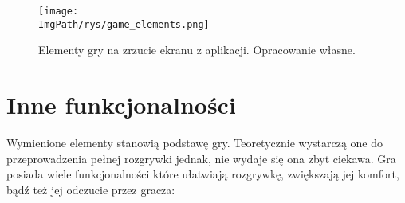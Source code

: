 \documentclass[a4paper,12pt,twoside,openany]{report}
\newcommand{\ImgPath}{.}
\begin{document}
\begin{figure}[!htbp]
	\begin{center}
\centering
\texttt{[image: \\ImgPath/rys/game\_elements.png]}
\end{center}
	\caption{Elementy gry na zrzucie ekranu z aplikacji. Opracowanie własne.}
	\label{game_elements}
\end{figure}

\section{Inne funkcjonalności}
Wymienione elementy stanowią podstawę gry. Teoretycznie wystarczą one do przeprowadzenia pełnej rozgrywki jednak, nie wydaje się ona zbyt ciekawa. Gra posiada wiele funkcjonalności które ułatwiają rozgrywkę, zwiększają jej komfort, bądź też jej odczucie przez gracza:
\end{document}
